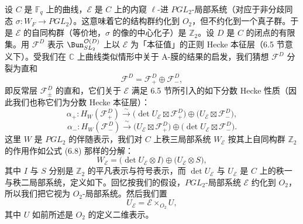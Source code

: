 设 $C$ 是 $\mathbb{F}_q$ 上的曲线，$\mathcal{E}$ 是 $C$ 上的内窥 $\ell$-进 $PGL_2$-局部系统（对应于非分歧同态 $\sigma : W_F \to PGL_2$）。这意味着它的结构群约化到 $O_2$，但不约化到一个真子群。于是 $\mathcal{E}$ 的自同构群（等价地，$\sigma$ 的像的中心化子）是 $\mathbb{Z}_2$。设 $D$ 是 $C$ 的闭点的有限集。用 $\mathcal{F}^D$ 表示 $\Bun^{\mathcal{O}(D)}_{SL_2}$ 上以 $\mathcal{E}$ 为「本征值」的正则 Hecke 本征层（6.5 节意义下）。受我们在 $\mathbb{C}$ 上曲线类似情形中关于 A-膜的结果的启发，我们猜想 $\mathcal{F}^D$ 分裂为直和
\begin{equation}\tag{8.6}
\mathcal{F}^D = \mathcal{F}^D_+ \oplus \mathcal{F}^D_-,
\end{equation}
即反常层 $\mathcal{F}^D_\pm$ 的直和，它们关于 $\mathcal{E}$ 满足 6.5 节所引入的如下分数 Hecke 性质（因此我们也称它们为分数 Hecke 本征层）：
\begin{equation}\tag{8.7}
\alpha_+ : H_W(\mathcal{F}^D_+) \xrightarrow{\ \sim\ } \bigl(\det U_{\mathcal{E}}\boxtimes \mathcal{F}^D_+\bigr)\oplus \bigl(U_{\mathcal{E}}\boxtimes \mathcal{F}^D_-\bigr),
\end{equation}
\begin{equation}\tag{8.8}
\alpha_- : H_W(\mathcal{F}^D_-) \xrightarrow{\ \sim\ } \bigl(U_{\mathcal{E}}\boxtimes \mathcal{F}^D_+\bigr)\oplus \bigl(\det U_{\mathcal{E}}\boxtimes \mathcal{F}^D_-\bigr).
\end{equation}
这里 $W$ 是 $PGL_2$ 的伴随表示，我们对 $C$ 上秩三局部系统 $W_{\mathcal{E}}$ 按其上自同构群 $\mathbb{Z}_2$ 的作用作如公式 (6.8) 那样的分解：
\begin{equation}\tag{8.9}
W_{\mathcal{E}} = \bigl(\det U_{\mathcal{E}}\otimes I\bigr)\oplus \bigl(U_{\mathcal{E}}\otimes S\bigr),
\end{equation}
其中 $I$ 与 $S$ 分别是 $\mathbb{Z}_2$ 的平凡表示与符号表示，而 $\det U_{\mathcal{E}}$ 与 $U_{\mathcal{E}}$ 是 $C$ 上的秩一与秩二局部系统，定义如下。回忆按我们的假设，$PGL_2$-局部系统 $\mathcal{E}$ 约化到 $O_2$，所以我们把它视为 $O_2$-局部系统。然后我们置
\[
U_{\mathcal{E}} = \mathcal{E}\times_{O_2} U,
\]
其中 $U$ 如前所述是 $O_2$ 的定义二维表示。


